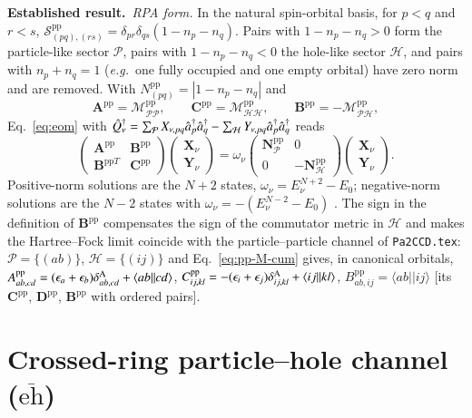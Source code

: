 \documentclass[aip,jcp,reprint,noshowkeys,superscriptaddress]{revtex4-1}
\newcommand{\eg}{\textit{e.g.}}
\newcommand{\cre}[1]{\Hat{a}_{#1}^{\dag}}
\newcommand{\bA}{\boldsymbol{A}}
\newcommand{\bB}{\boldsymbol{B}}
\newcommand{\bC}{\boldsymbol{C}}
\newcommand{\bD}{\boldsymbol{D}}
\newcommand{\bN}{\boldsymbol{N}}
\newcommand{\bX}{\boldsymbol{X}}
\newcommand{\bY}{\boldsymbol{Y}}
\newcommand{\bcalM}{\boldsymbol{\mathcal M}}
\newcommand{\eps}{\epsilon}
\newcommand{\teh}{\overline{\text{eh}}}
\newcommand{\pp}{\text{pp}}
\newcommand{\Established}{\textbf{Established result.}\ }
\begin{document}
\Established \emph{RPA form.}  In the natural spin-orbital basis, for $p<q$
and $r<s$, $\mathcal S^{\pp}_{(pq),(rs)}=\delta_{pr}\delta_{qs}(1-n_p-n_q)$.
Pairs with $1-n_p-n_q>0$ form the particle-like sector $\mathcal P$, pairs with
$1-n_p-n_q<0$ the hole-like sector $\mathcal H$, and pairs with $n_p+n_q=1$
(\eg\ one fully occupied and one empty orbital) have zero norm and are removed.
With $N^{\pp}_{(pq)}=|1-n_p-n_q|$ and
\begin{equation}
  \bA^{\pp}=\bcalM^{\pp}_{\mathcal P\mathcal P},\qquad
  \bC^{\pp}=\bcalM^{\pp}_{\mathcal H\mathcal H},\qquad
  \bB^{\pp}=-\bcalM^{\pp}_{\mathcal P\mathcal H},
  \label{eq:pp-ABC}
\end{equation}
Eq.~\eqref{eq:eom} with
$\hat Q^\dagger_\nu=\sum_{\mathcal P}X_{\nu,pq}\cre{p}\cre{q}-\sum_{\mathcal H}Y_{\nu,pq}\cre{p}\cre{q}$
reads
\begin{equation}
  \begin{pmatrix}\bA^{\pp}&\bB^{\pp}\\ \bB^{\pp T}&\bC^{\pp}\end{pmatrix}
  \begin{pmatrix}\bX_\nu\\ \bY_\nu\end{pmatrix}
  =\omega_\nu
  \begin{pmatrix}\bN^{\pp}_{\mathcal P}&0\\0&-\bN^{\pp}_{\mathcal H}\end{pmatrix}
  \begin{pmatrix}\bX_\nu\\ \bY_\nu\end{pmatrix}.
  \label{eq:pp-rpa}
\end{equation}
Positive-norm solutions are the $N{+}2$ states, $\omega_\nu=E^{N+2}_\nu-E_0$;
negative-norm solutions are the $N{-}2$ states with
$\omega_\nu=-(E^{N-2}_\nu-E_0)$ \cite{SchuckBook,Scuseria2013}.  The sign in
the definition of $\bB^{\pp}$ compensates the sign of the commutator metric in
$\mathcal H$ and makes the Hartree--Fock limit coincide with the
particle--particle channel of \texttt{Pa2CCD.tex}: $\mathcal P=\{(ab)\}$,
$\mathcal H=\{(ij)\}$ and Eq.~\eqref{eq:pp-M-cum} gives, in canonical orbitals,
$A^{\pp}_{ab,cd}=(\eps_a+\eps_b)\delta^{\rm A}_{ab,cd}+\langle ab||cd\rangle$,
$C^{\pp}_{ij,kl}=-(\eps_i+\eps_j)\delta^{\rm A}_{ij,kl}+\langle ij||kl\rangle$,
$B^{\pp}_{ab,ij}=\langle ab||ij\rangle$ [its $\bC^{\pp}$, $\bD^{\pp}$, $\bB^{\pp}$
with ordered pairs].

\section{Crossed-ring particle--hole channel (\texorpdfstring{$\teh$}{eh-bar})}
\label{sec:teh}
\end{document}
